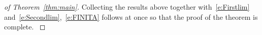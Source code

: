 \documentclass[reqno,11pt]{preprint}
\newcommand{\Exp}{\mathbf{E}}
\newcommand{\wN}{w^{\eps,n}}
\newcommand{\WN}{\mathcal{W}^{\eps,n}}
\newcommand{\T}{\mathbb{T}}
\newcommand{\J}{\mathbb{J}}
\newcommand{\cA}{\mathcal{A}}
\newcommand{\cD}{\mathcal{D}}
\newcommand{\cL}{\mathcal{L}}
\newcommand{\cS}{\mathcal{S}}
\newcommand{\dd}{\mathrm{d}}      %
\newcommand{\eff}{\mathrm{eff}}
\newcommand{\fw}{\mathfrak{w}}
\newcommand{\1}{\mathds{1}}
\def\indN#1{{	\J^\eps_{#1}	}}
\newcommand{\gen}{\cL^\eps}
\newcommand{\geneff}{\cL^\eff}
\newcommand{\gensy}{\cL_0}
\newcommand{\genap}{\cA^{\eps}_+}
\newcommand{\genam}{\cA^{\eps}_-}
\begin{document}
\begin{proof}[of Theorem~\ref{thm:main}]
{Collecting the results above together with~\eqref{e:Firstlim} and~\eqref{e:Secondlim},~\eqref{e:FINITA} 
follows at once so that the proof of the theorem is complete. }
%
%
%
%
%
%
%
%
%
%
%

\end{proof}
\end{document}
